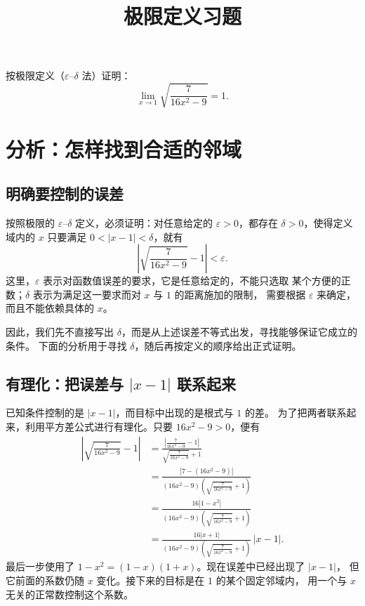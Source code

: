 \documentclass{ctexart}
\title{极限定义习题}
\author{}
\date{}
\begin{document}
\maketitle

按极限定义（$\varepsilon$--$\delta$ 法）证明：
\[
  \lim_{x\to 1}\sqrt{\frac{7}{16x^2-9}}=1.
\]

\section{分析：怎样找到合适的邻域}

\subsection{明确要控制的误差}

按照极限的 $\varepsilon$--$\delta$ 定义，必须证明：对任意给定的
$\varepsilon>0$，都存在 $\delta>0$，使得定义域内的 $x$ 只要满足
$0<|x-1|<\delta$，就有
\[
  \left|\sqrt{\frac{7}{16x^2-9}}-1\right|<\varepsilon.
\]
这里，$\varepsilon$ 表示对函数值误差的要求，它是任意给定的，不能只选取
某个方便的正数；$\delta$ 表示为满足这一要求而对 $x$ 与 $1$ 的距离施加的限制，
需要根据 $\varepsilon$ 来确定，而且不能依赖具体的 $x$。

因此，我们先不直接写出 $\delta$，而是从上述误差不等式出发，寻找能够保证它成立的条件。
下面的分析用于寻找 $\delta$，随后再按定义的顺序给出正式证明。

\subsection{有理化：把误差与 \texorpdfstring{$|x-1|$}{|x-1|} 联系起来}

已知条件控制的是 $|x-1|$，而目标中出现的是根式与 $1$ 的差。
为了把两者联系起来，利用平方差公式进行有理化。只要 $16x^2-9>0$，便有
\begin{align*}
  \left|\sqrt{\frac{7}{16x^2-9}}-1\right|
  &=\frac{\left|\frac{7}{16x^2-9}-1\right|}
          {\sqrt{\frac{7}{16x^2-9}}+1}\\
  &=\frac{|7-(16x^2-9)|}
          {(16x^2-9)\left(\sqrt{\frac{7}{16x^2-9}}+1\right)}\\
  &=\frac{16|1-x^2|}
          {(16x^2-9)\left(\sqrt{\frac{7}{16x^2-9}}+1\right)}\\
  &=\frac{16|x+1|}
          {(16x^2-9)\left(\sqrt{\frac{7}{16x^2-9}}+1\right)}\,|x-1|.
\end{align*}
最后一步使用了 $1-x^2=(1-x)(1+x)$。现在误差中已经出现了 $|x-1|$，
但它前面的系数仍随 $x$ 变化。接下来的目标是在 $1$ 的某个固定邻域内，
用一个与 $x$ 无关的正常数控制这个系数。
\end{document}

